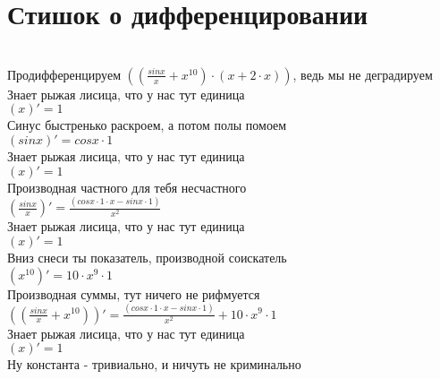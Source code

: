 \documentclass[a4paper,12pt]{article}
\begin{document}
\section*{Стишок о дифференцировании}\\
Продифференцируем $(( \frac{ sin x }{x}  + x ^{10} ) \cdot (x + 2 \cdot x))$, ведь мы не деградируем\\
Знает рыжая лисица, что у нас тут единица\\
\begin{math}
	(x)' = 1
\end{math}\\
Синус быстренько раскроем, а потом полы помоем\\
\begin{math}
	( sin x )' =  cos x  \cdot 1
\end{math}\\
Знает рыжая лисица, что у нас тут единица\\
\begin{math}
	(x)' = 1
\end{math}\\
Производная частного для тебя несчастного\\
\begin{math}
	( \frac{ sin x }{x} )' =  \frac{( cos x  \cdot 1 \cdot x -  sin x  \cdot 1)}{x ^{2} } 
\end{math}\\
Знает рыжая лисица, что у нас тут единица\\
\begin{math}
	(x)' = 1
\end{math}\\
Вниз снеси ты показатель, производной соискатель\\
\begin{math}
	(x ^{10} )' = 10 \cdot x ^{9}  \cdot 1
\end{math}\\
Производная суммы, тут ничего не рифмуется\\
\begin{math}
	(( \frac{ sin x }{x}  + x ^{10} ))' =  \frac{( cos x  \cdot 1 \cdot x -  sin x  \cdot 1)}{x ^{2} }  + 10 \cdot x ^{9}  \cdot 1
\end{math}\\
Знает рыжая лисица, что у нас тут единица\\
\begin{math}
	(x)' = 1
\end{math}\\
Ну константа - тривиально, и ничуть не криминально\\
\end{document}
